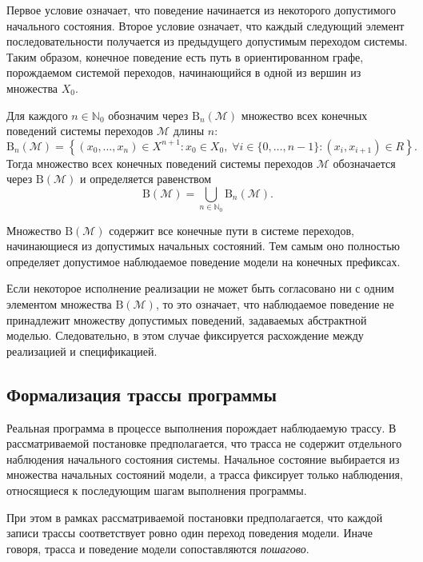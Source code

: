 Первое условие означает, что поведение начинается из некоторого допустимого
начального состояния. Второе условие означает, что каждый следующий элемент
последовательности получается из предыдущего допустимым переходом системы.
Таким образом, конечное поведение есть путь в ориентированном графе,
порождаемом системой переходов, начинающийся в одной из вершин из множества
$X_0$.

\begin{definition}\label{def:B_k}
Для каждого $n \in \mathbb{N}_0$ обозначим через $\mathrm{B}_n(\mathcal{M})$
множество всех конечных поведений системы переходов $\mathcal{M}$ длины $n$:
\[
\mathrm{B}_n(\mathcal{M})
=
\left\{
(x_0,\dots,x_n) \in X^{n+1}
:
x_0 \in X_0,\;
\forall i \in \{0,\dots,n-1\} : (x_i,x_{i+1}) \in R
\right\}.
\]
Тогда множество всех конечных поведений системы переходов $\mathcal{M}$
обозначается через $\mathrm{B}(\mathcal{M})$ и определяется равенством
\begin{equation}\label{f3}
\mathrm{B}(\mathcal{M})
=
\bigcup_{n \in \mathbb{N}_0} \mathrm{B}_n(\mathcal{M}).
\end{equation}
\end{definition}

Множество $\mathrm{B}(\mathcal{M})$ содержит все конечные пути в системе
переходов, начинающиеся из допустимых начальных состояний. Тем самым оно
полностью определяет допустимое наблюдаемое поведение модели на конечных
префиксах.

Если некоторое исполнение реализации не может быть согласовано ни с одним
элементом множества $\mathrm{B}(\mathcal{M})$, то это означает, что наблюдаемое
поведение не принадлежит множеству допустимых поведений, задаваемых абстрактной
моделью. Следовательно, в этом случае фиксируется расхождение между реализацией
и спецификацией.

\subsection{Формализация трассы программы}

Реальная программа в процессе выполнения порождает наблюдаемую трассу. В
рассматриваемой постановке предполагается, что трасса не содержит отдельного
наблюдения начального состояния системы. Начальное состояние выбирается из
множества начальных состояний модели, а трасса фиксирует только наблюдения,
относящиеся к последующим шагам выполнения программы.

При этом в рамках рассматриваемой постановки предполагается, что каждой записи
трассы соответствует ровно один переход поведения модели. Иначе говоря, трасса
и поведение модели сопоставляются \emph{пошагово}.

